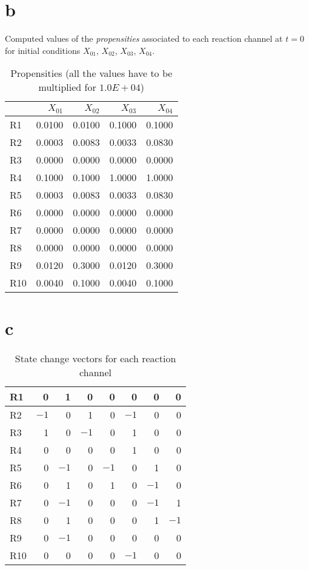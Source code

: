 \section{b}
Computed values of the \emph{propensities} associated to each reaction channel
at $t=0$ for initial conditions $X_{01}$, $X_{02}$, $X_{03}$, $X_{04}$.

\begin{table}[h!]
\begin{center}
\begin{tabular}{|l|rrrr|}
\hline
& $X_{01}$ & $X_{02}$ & $X_{03}$ & $X_{04}$ \\
\hline
R1 & 0.0100 & 0.0100 & 0.1000 & 0.1000 \\
R2 & 0.0003 &0.0083 & 0.0033 & 0.0830 \\
R3 & 0.0000 & 0.0000 & 0.0000 & 0.0000 \\
R4 & 0.1000  & 0.1000 & 1.0000 & 1.0000 \\
R5 & 0.0003 & 0.0083 & 0.0033 & 0.0830 \\
R6 & 0.0000 & 0.0000 & 0.0000 & 0.0000 \\
R7 & 0.0000 & 0.0000 & 0.0000 & 0.0000 \\
R8 & 0.0000 & 0.0000 & 0.0000 & 0.0000 \\
R9 & 0.0120 & 0.3000 & 0.0120 & 0.3000 \\
R10 & 0.0040 & 0.1000 & 0.0040 & 0.1000 \\
\hline
\bottomrule
\end{tabular}
\caption{Propensities (all the values have to be multiplied for
$1.0E+04$)}
\end{center}
\end{table}					

\section{c}

\begin{table}[h!]
\begin{center}
\begin{tabular}{|l|rrrrrrr|}
\hline
R1 & 0 & 1 & 0 & 0 & 0 & 0 & 0 \\
\hline
R2 & $-1$ & 0 & 1 & 0 & $-1$ & 0 & 0 \\
\hline
R3 & 1 &0 &$-1$ &0 &1 &0 &0\\
\hline
R4 & 0 &0 &0 &0 &1 &0 &0\\
\hline
R5 & 0 &$-1$ &0 &$-1$ &0 &1 &0\\
\hline
R6 & 0 &1 &0 &1 &0 &$-1$ &0\\
\hline
R7 & 0 &$-1$ &0 &0 &0 &$-1$ &1\\
\hline
R8 & 0 &1 &0 &0 &0 &1 &$-1$\\
\hline
R9 & 0 & $-1$ &0 &0 &0 &0 &0\\
\hline
R10 & 0 &0 &0 &0 &$-1$ &0 &0\\
\hline
\bottomrule
\end{tabular}
\caption{State change vectors for each reaction channel}
\end{center}
\end{table}					
\newpage
